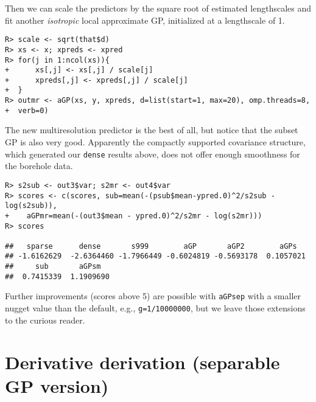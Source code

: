 \documentclass[12pt]{article}
\begin{document}
\noindent Then we can scale the predictors by the square root of estimated lengthscales 
and fit another {\em isotropic} local approximate GP, initialized at a lengthscale of 1. 

{\singlespacing
\begin{verbatim}
R> scale <- sqrt(that$d)
R> xs <- x; xpreds <- xpred
R> for(j in 1:ncol(xs)){
+      xs[,j] <- xs[,j] / scale[j]
+      xpreds[,j] <- xpreds[,j] / scale[j]
+  }
R> outmr <- aGP(xs, y, xpreds, d=list(start=1, max=20), omp.threads=8, 
+  verb=0)
\end{verbatim}}

\noindent The new multiresolution predictor is the best of all, but notice that 
the subset GP is also very good.  Apparently the compactly supported
covariance structure, which generated our {\tt dense} results above, does not
offer enough smoothness for the borehole data.

{\singlespacing
\begin{verbatim}
R> s2sub <- out3$var; s2mr <- out4$var
R> scores <- c(scores, sub=mean(-(psub$mean-ypred.0)^2/s2sub - log(s2sub)),
+    aGPmr=mean(-(out3$mean - ypred.0)^2/s2mr - log(s2mr)))
R> scores

##   sparse      dense       s999        aGP       aGP2        aGPs
## -1.6162629  -2.6364460 -1.7966449 -0.6024819 -0.5693178  0.1057021
##     sub       aGPsm 
##  0.7415339  1.1909690
\end{verbatim}}

\noindent Further improvements (scores above 5) are possible with {\tt aGPsep}
with a smaller nugget value than the default, e.g.,
\verb!g=1/10000000!, but we leave those extensions to the curious reader.

\section{Derivative derivation (separable GP version)}
\label{sec:dd}
\end{document}
